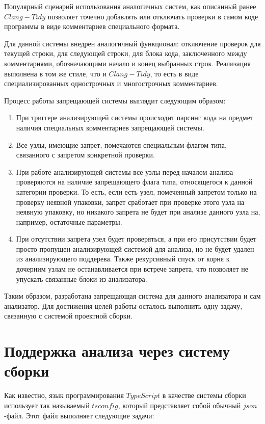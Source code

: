 \documentclass{mipt-thesis-bs}
\begin{document}
Популярный сценарий использования аналогичных систем, как описанный ранее $Clang-Tidy$ 
позволяет точечно добавлять или отключать проверки в самом коде программы в виде 
комментариев специального формата.

Для данной системы внедрен аналогичный функционал: отключение проверок для текущей строки, для 
следующей строки, для блока кода, заключенного между комментариями, обозначающими начало и конец 
выбранных строк. Реализация выполнена в том же стиле, что и $Clang-Tidy$, то есть в виде 
специализированных однострочных и многострочных комментариев.

Процесс работы запрещающей системы выглядит следующим образом:
\begin{enumerate}
    \item При триггере анализирующей системы происходит парсинг кода на предмет наличия специальных 
    комментариев запрещающей системы.
    \item Все узлы, имеющие запрет, помечаются специальным флагом типа, связанного с запретом конкретной проверки.
    \item При работе анализирующей системы все узлы перед началом анализа проверяются на наличие запрещающего флага типа, 
    относящегося к данной категории проверки. То есть, если есть узел, помеченный запретом только на проверку неявной упаковки, 
    запрет сработает при проверке этого узла на неявную упаковку, но никакого запрета не будет при анализе данного узла на, 
    например, остаточные параметры.
    \item При отсутствии запрета узел будет проверяться, а при его присутствии будет просто пропущен анализирующей системой 
    для анализа, но не будет удален из анализирующего поддерева. Также рекурсивный спуск от корня к дочерним узлам не 
    останавливается при встрече запрета, что позволяет не упускать связанные блоки из анализатора.
\end{enumerate}

Таким образом, разработана запрещающая система для данного анализатора и сам анализатор. Для достижения целей работы 
осталось выполнить одну задачу, связанную с системой проектной сборки.

\section{Поддержка анализа через систему сборки}

Как известно, язык программирования $TypeScript$ в качестве системы сборки использует так называемый 
$tsconfig$, который представляет собой обычный $json$-файл. Этот файл выполняет следующие задачи:
\end{document}
